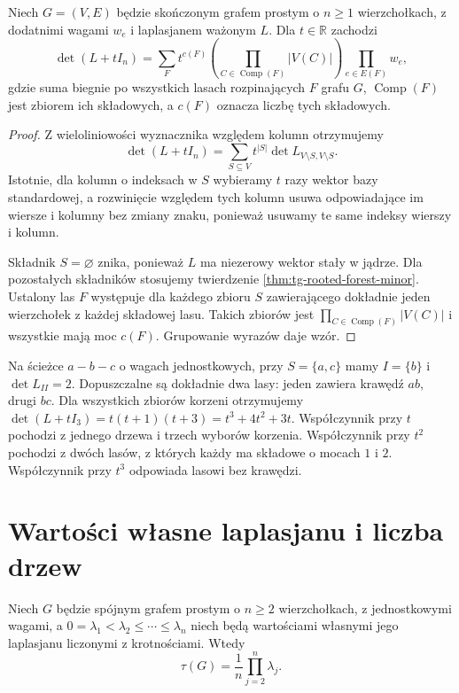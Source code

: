 \begin{wniosek}
\label{cor:tg-rooted-forest-polynomial}
Niech $G=(V,E)$ będzie skończonym grafem prostym
o $n\geq1$ wierzchołkach, z dodatnimi wagami $w_e$
i laplasjanem ważonym $L$. Dla $t\in\mathbb R$
zachodzi
\[
\det(L+tI_n)=
\sum_F t^{c(F)}
\left(\prod_{C\in\operatorname{Comp}(F)}|V(C)|\right)
\prod_{e\in E(F)}w_e,
\]
gdzie suma biegnie po wszystkich lasach rozpinających
$F$ grafu $G$, $\operatorname{Comp}(F)$ jest zbiorem ich
składowych, a $c(F)$ oznacza liczbę tych składowych.
\end{wniosek}
\begin{proof}
Z wieloliniowości wyznacznika względem kolumn
otrzymujemy
\[
\det(L+tI_n)=\sum_{S\subseteq V}t^{|S|}
\det L_{V\setminus S,V\setminus S}.
\]
Istotnie, dla kolumn o indeksach w $S$ wybieramy $t$ razy
wektor bazy standardowej, a rozwinięcie względem
tych kolumn usuwa odpowiadające im wiersze i kolumny
bez zmiany znaku, ponieważ usuwamy te same indeksy
wierszy i kolumn.

Składnik $S=\varnothing$ znika,
ponieważ $L$ ma niezerowy wektor stały w jądrze.
Dla pozostałych składników stosujemy twierdzenie
\ref{thm:tg-rooted-forest-minor}.
Ustalony las $F$ występuje dla każdego zbioru $S$
zawierającego dokładnie jeden wierzchołek z każdej
składowej lasu. Takich zbiorów jest
$\prod_{C\in\operatorname{Comp}(F)}|V(C)|$ i wszystkie
mają moc $c(F)$. Grupowanie wyrazów daje wzór.
\end{proof}

\begin{przyklad}
Na ścieżce $a-b-c$ o wagach jednostkowych, przy
$S=\{a,c\}$ mamy $I=\{b\}$ i $\det L_{II}=2$.
Dopuszczalne są dokładnie dwa lasy: jeden zawiera
krawędź $ab$, drugi $bc$. Dla wszystkich zbiorów
korzeni otrzymujemy
$\det(L+tI_3)=t(t+1)(t+3)=t^3+4t^2+3t$.
Współczynnik przy $t$ pochodzi z jednego drzewa
i trzech wyborów korzenia. Współczynnik przy $t^2$
pochodzi z dwóch lasów, z których każdy ma
składowe o mocach $1$ i $2$. Współczynnik przy $t^3$
odpowiada lasowi bez krawędzi.
\end{przyklad}

\section{Wartości własne laplasjanu i liczba drzew}
\label{sec:tg-spectrum-tree}

\begin{twierdzenie}
\label{thm:tg-spectral-tree}
Niech $G$ będzie spójnym grafem prostym o $n\ge2$
wierzchołkach, z jednostkowymi wagami, a
$0=\lambda_1<\lambda_2\le\cdots\le\lambda_n$
niech będą wartościami własnymi jego laplasjanu
liczonymi z krotnościami. Wtedy
\[
\tau(G)=\frac1n\prod_{j=2}^n\lambda_j.
\]
\end{twierdzenie}

